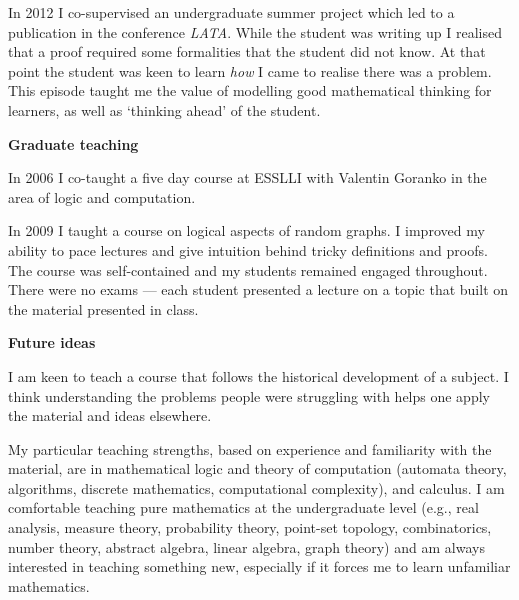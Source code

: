 \documentclass[12pt]{article}
\theoremstyle{plain} \numberwithin{equation}{section}
\theoremstyle{definition}
\begin{document}
In 2012 I co-supervised an undergraduate summer project which led to a publication in the conference {\em LATA}.  While the student was writing up I realised that a proof required some formalities that the student did not know. At that point the student was keen to learn {\em how} I came to realise there was a problem. This episode taught me the value of modelling good mathematical thinking for learners, as well as `thinking ahead' of the student.

{\bf Graduate teaching}

In 2006 I co-taught a five day course at ESSLLI with Valentin Goranko in the area of logic and computation. 

In 2009 I taught a course on logical aspects of random graphs. I improved my ability to pace lectures and give intuition
behind tricky definitions and proofs. The course was self-contained and my students remained engaged throughout. 
There were no exams --- each student presented a lecture on a topic that built on the material presented in class.

{\bf Future ideas}

I am keen to teach a course that follows the historical development of a subject. I think understanding the
problems people were struggling with helps one apply the material and ideas elsewhere.



My particular teaching strengths, based on experience and familiarity with the material, are in mathematical logic and theory of computation (automata theory, algorithms, discrete mathematics, computational complexity), and calculus. I am comfortable teaching pure mathematics at the undergraduate level (e.g., real analysis, measure theory, probability theory, point-set topology, combinatorics, number theory, abstract algebra, linear algebra, graph theory) and am always interested in teaching something new, especially if it forces me to learn unfamiliar mathematics. %
\end{document}
